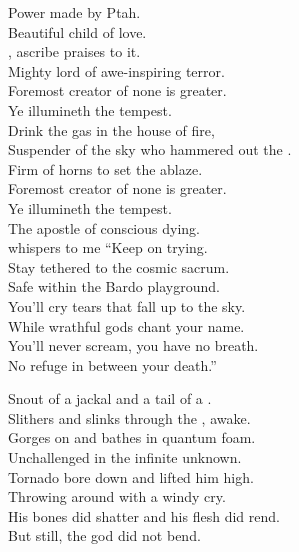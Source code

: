 
Power made by Ptah. \\
Beautiful child of love. \\
, ascribe praises to it. \\
Mighty lord of awe-inspiring terror. \\
Foremost creator of none is greater. \\
Ye illumineth the tempest. \\

Drink the gas in the house of fire, \\
Suspender of the sky who hammered out the . \\
Firm of horns to set the  ablaze. \\
Foremost creator of none is greater. \\
Ye illumineth the tempest. \\

The apostle of conscious dying. \\
whispers to me ``Keep on trying. \\
Stay tethered to the cosmic sacrum. \\
Safe within the Bardo playground. \\
You'll cry tears that fall up to the sky. \\
While wrathful gods chant your name. \\
You'll never scream, you have no breath. \\
No refuge in between your death.'' \\




Snout of a jackal and a tail of a . \\
Slithers and slinks through the , awake. \\
Gorges on  and bathes in quantum foam. \\
Unchallenged in the infinite unknown. \\

Tornado bore down and lifted him high. \\
Throwing  around with a windy cry. \\
His bones did shatter and his flesh did rend. \\
But still, the god did not bend. \\

